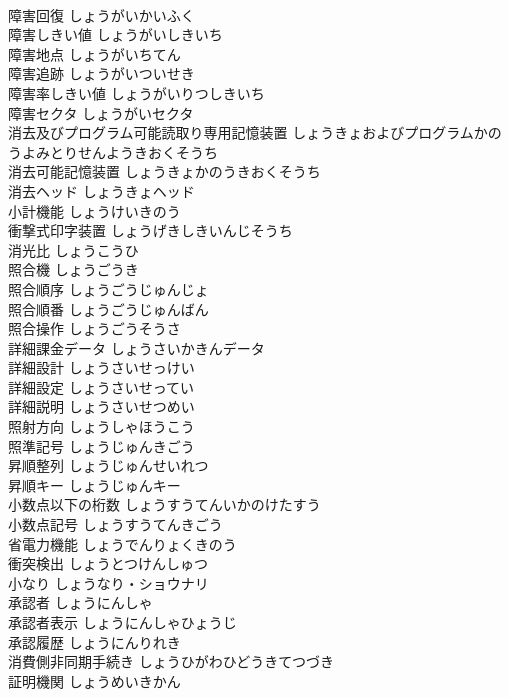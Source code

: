 \documentclass[8pt]{extreport}
\begin{document}
\begin{CJK}{UTF8}{min}
\\	障害回復	しょうがいかいふく	
\\	障害しきい値	しょうがいしきいち	
\\	障害地点	しょうがいちてん	
\\	障害追跡	しょうがいついせき	
\\	障害率しきい値	しょうがいりつしきいち	
\\	障害セクタ	しょうがいセクタ	
\\	消去及びプログラム可能読取り専用記憶装置	しょうきょおよびプログラムかのうよみとりせんようきおくそうち	
\\	消去可能記憶装置	しょうきょかのうきおくそうち	
\\	消去ヘッド	しょうきょヘッド	
\\	小計機能	しょうけいきのう	
\\	衝撃式印字装置	しょうげきしきいんじそうち	
\\	消光比	しょうこうひ	
\\	照合機	しょうごうき	
\\	照合順序	しょうごうじゅんじょ	
\\	照合順番	しょうごうじゅんばん	
\\	照合操作	しょうごうそうさ	
\\	詳細課金データ	しょうさいかきんデータ	
\\	詳細設計	しょうさいせっけい	
\\	詳細設定	しょうさいせってい	
\\	詳細説明	しょうさいせつめい	
\\	照射方向	しょうしゃほうこう	
\\	照準記号	しょうじゅんきごう	
\\	昇順整列	しょうじゅんせいれつ	
\\	昇順キー	しょうじゅんキー	
\\	小数点以下の桁数	しょうすうてんいかのけたすう	
\\	小数点記号	しょうすうてんきごう	
\\	省電力機能	しょうでんりょくきのう	
\\	衝突検出	しょうとつけんしゅつ	
\\	小なり	しょうなり・ショウナリ	
\\	承認者	しょうにんしゃ	
\\	承認者表示	しょうにんしゃひょうじ	
\\	承認履歴	しょうにんりれき	
\\	消費側非同期手続き	しょうひがわひどうきてつづき	
\\	証明機関	しょうめいきかん	

\end{CJK}
\end{document}
